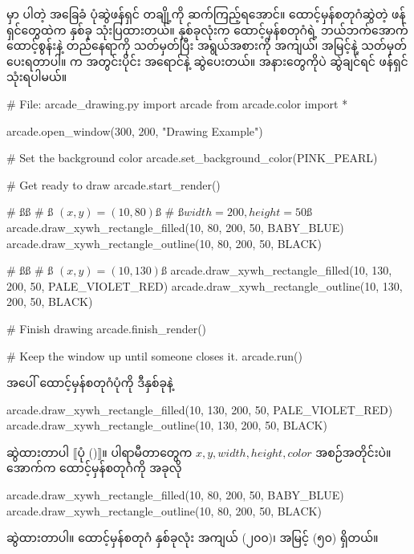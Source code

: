  မှာ ပါတဲ့ အခြေခံ ပုံဆွဲဖန်ရှင် တချို့ကို ဆက်ကြည့်ရအောင်။ ထောင့်မှန်စတုဂံဆွဲတဲ့ ဖန်ရှင်တွေထဲက နှစ်ခု သုံးပြထားတယ်။ နှစ်ခုလုံးက  ထောင့်မှန်စတုဂံရဲ့ ဘယ်ဘက်အောက် ထောင့်စွန်းနဲ့ တည်နေရာကို သတ်မှတ်ပြီး အရွယ်အစားကို အကျယ်၊ အမြင့်နဲ့ သတ်မှတ်ပေးရတာပါ။   က အတွင်းပိုင်း အရောင်နဲ့ ဆွဲပေးတယ်။ အနားတွေကိုပဲ ဆွဲချင်ရင်  ဖန်ရှင်သုံးရပါမယ်။
%
\begin{py}
# File: arcade_drawing.py
import arcade
from arcade.color import *

arcade.open_window(300, 200, "Drawing Example")

# Set the background color
arcade.set_background_color(PINK_PEARL)

# Get ready to draw
arcade.start_render()

# ßß
# ß $(x,y) = (10, 80)$ß
# ß$width=200, height=50$ß
arcade.draw_xywh_rectangle_filled(10, 80, 200, 50, BABY_BLUE)
arcade.draw_xywh_rectangle_outline(10, 80, 200, 50, BLACK)

# ßß
# ß $(x,y) = (10, 130)$ß
arcade.draw_xywh_rectangle_filled(10, 130, 200, 50, PALE_VIOLET_RED)
arcade.draw_xywh_rectangle_outline(10, 130, 200, 50, BLACK)

# Finish drawing
arcade.finish_render()

# Keep the window up until someone closes it.
arcade.run()

\end{py}
%
အပေါ် ထောင့်မှန်စတုဂံပုံကို ဒီနှစ်ခုနဲ့ 
%
\begin{py}
arcade.draw_xywh_rectangle_filled(10, 130, 200, 50, PALE_VIOLET_RED)
arcade.draw_xywh_rectangle_outline(10, 130, 200, 50, BLACK)
\end{py}
%
ဆွဲထားတာပါ $\big\llbracket$ပုံ (\fRefNo{\ref{fig:ch07rects}})$\big\rrbracket$။ ပါရာမီတာတွေက $x, y, width, height, color$ အစဉ်အတိုင်းပဲ။ အောက်က ထောင့်မှန်စတုဂံကို အခုလို
%
\begin{py}
arcade.draw_xywh_rectangle_filled(10, 80, 200, 50, BABY_BLUE)
arcade.draw_xywh_rectangle_outline(10, 80, 200, 50, BLACK)
\end{py}
%
ဆွဲထားတာပါ။ ထောင့်မှန်စတုဂံ နှစ်ခုလုံး အကျယ် (၂၀၀)၊ အမြင့် (၅၀)  ရှိတယ်။
%
\begin{figure}[tb!]
\caption{}
\label{fig:ch07rects}
\end{figure}
%
%


